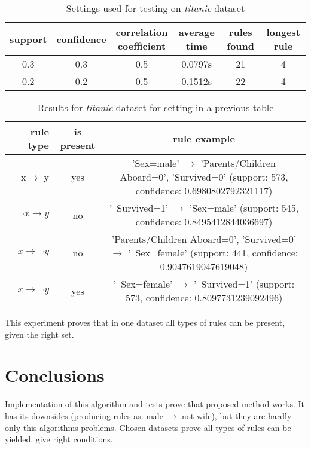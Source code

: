 \documentclass{article}
\begin{document}
	\begin{table}[H]
		\centering
		\caption{Settings used for testing on \textit{titanic} dataset}
		\label{ts}
		\begin{tabular}{c |c |c|c|c|c}
			support&confidence&\makecell{correlation\\coefficient}&average time&rules found&longest rule\\
			\hline
			\hline
			0.3&0.3&0.5&0.0797s&21&4\\
			\hline
			0.2&0.2&0.5&0.1512s&22&4\\
		\end{tabular}
	\end{table}
	\begin{table}[H]
		\centering
		\caption{Results for \textit{titanic} dataset for setting in a previous table}
		\label{tr}
		\begin{tabular}{r|c |c}
			rule type& is present & rule example\\
			\hline
			\hline
			x$\rightarrow$ y & yes &\makecell{'Sex=male' $\rightarrow$\\ 'Parents/Children Aboard=0', 'Survived=0'\\ (support: 573, confidence: 0.6980802792321117)} \\
			\hline
			$\neg x\rightarrow y$ & no &\makecell{'~Survived=1' $\rightarrow$\\ 'Sex=male'\\ (support: 545, confidence: 0.8495412844036697)}\\
			\hline
			$x\rightarrow \neg y $& no &\makecell{'Parents/Children Aboard=0', 'Survived=0' $\rightarrow$\\ '~Sex=female'\\ (support: 441, confidence: 0.9047619047619048)}\\
			\hline
			$\neg x\rightarrow \neg y $& yes &\makecell{'~Sex=female' $\rightarrow$\\ '~Survived=1'\\ (support: 573, confidence: 0.8097731239092496)} \\ 
		\end{tabular}
	\end{table}
	This experiment proves that in one dataset all types of rules can be present, given the right set.
	
	\section{Conclusions}
	Implementation of this algorithm and tests prove that proposed method works. It has its downsides (producing rules as: male $\rightarrow$ not wife), but they are hardly only this algorithms problems. Chosen datasets prove all types of rules can be yielded, give right conditions.
\end{document}
